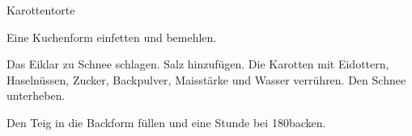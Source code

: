 \begin{recipe}[\vegetarian]{Karottentorte}
%
%
%
%
%

\begin{ingredients}
\end{ingredients}

\begin{instructions}
    Eine Kuchenform einfetten und bemehlen.

    Das Eiklar zu Schnee schlagen.
    Salz hinzufügen.
    Die Karotten mit Eidottern, Haselnüssen, Zucker, Backpulver, Maisstärke und Wasser verrühren.
    Den Schnee unterheben.

    Den Teig in die Backform füllen und eine Stunde bei 180\degC backen.
\end{instructions}
\end{recipe}
